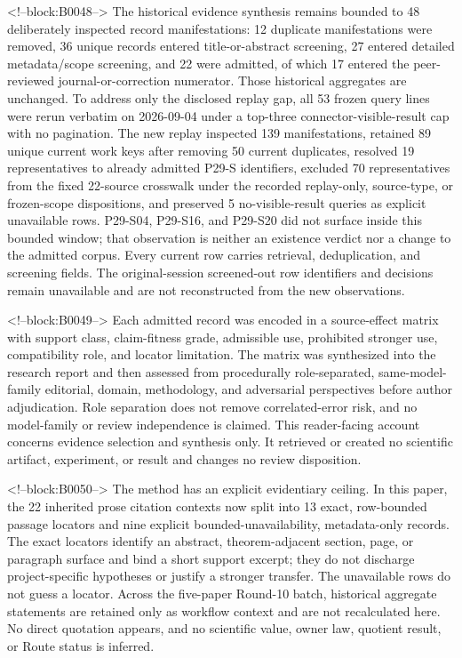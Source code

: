 \documentclass[11pt,a4paper]{article}
\begin{document}
<!--block:B0048-->
The historical evidence synthesis remains bounded to 48 deliberately inspected record manifestations: 12 duplicate manifestations were removed, 36 unique records entered title-or-abstract screening, 27 entered detailed metadata/scope screening, and 22 were admitted, of which 17 entered the peer-reviewed journal-or-correction numerator. Those historical aggregates are unchanged. To address only the disclosed replay gap, all 53 frozen query lines were rerun verbatim on 2026-09-04 under a top-three connector-visible-result cap with no pagination. The new replay inspected 139 manifestations, retained 89 unique current work keys after removing 50 current duplicates, resolved 19 representatives to already admitted P29-S identifiers, excluded 70 representatives from the fixed 22-source crosswalk under the recorded replay-only, source-type, or frozen-scope dispositions, and preserved 5 no-visible-result queries as explicit unavailable rows. P29-S04, P29-S16, and P29-S20 did not surface inside this bounded window; that observation is neither an existence verdict nor a change to the admitted corpus. Every current row carries retrieval, deduplication, and screening fields. The original-session screened-out row identifiers and decisions remain unavailable and are not reconstructed from the new observations.

<!--block:B0049-->
Each admitted record was encoded in a source-effect matrix with support class, claim-fitness grade, admissible use, prohibited stronger use, compatibility role, and locator limitation. The matrix was synthesized into the research report and then assessed from procedurally role-separated, same-model-family editorial, domain, methodology, and adversarial perspectives before author adjudication. Role separation does not remove correlated-error risk, and no model-family or review independence is claimed. This reader-facing account concerns evidence selection and synthesis only. It retrieved or created no scientific artifact, experiment, or result and changes no review disposition.

<!--block:B0050-->
The method has an explicit evidentiary ceiling. In this paper,
the 22 inherited prose citation contexts now split into 13 exact, row-bounded passage
locators and nine explicit bounded-unavailability, metadata-only records. The exact
locators identify an abstract, theorem-adjacent section, page, or paragraph surface
and bind a short support excerpt; they do not discharge project-specific hypotheses
or justify a stronger transfer. The unavailable rows do not guess a locator. Across
the five-paper Round-10 batch, historical aggregate statements are retained only as
workflow context and are not recalculated here. No direct quotation appears, and no
scientific value, owner law, quotient result, or Route status is inferred.
\end{document}
